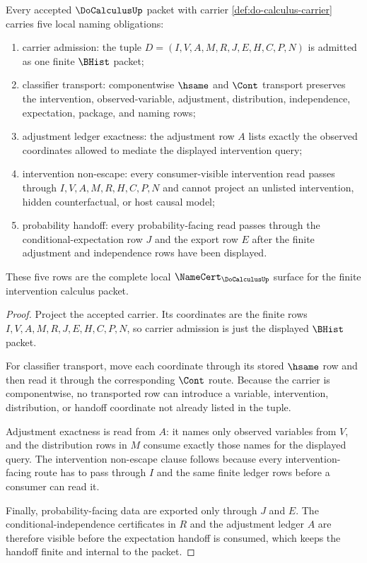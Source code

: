\begin{theorem}
\label{thm:do-calculus-namecert-obligation-surface}
Every accepted $\DoCalculusUp$ packet with carrier
\autoref{def:do-calculus-carrier} carries five local naming obligations:
\begin{enumerate}
\item carrier admission: the tuple $D=(I,V,A,M,R,J,E,H,C,P,N)$ is admitted as
one finite $\BHist$ packet;
\item classifier transport: componentwise $\hsame$ and $\Cont$ transport
preserves the intervention, observed-variable, adjustment, distribution,
independence, expectation, package, and naming rows;
\item adjustment ledger exactness: the adjustment row $A$ lists exactly the
observed coordinates allowed to mediate the displayed intervention query;
\item intervention non-escape: every consumer-visible intervention read passes
through $I,V,A,M,R,H,C,P,N$ and cannot project an unlisted intervention, hidden
counterfactual, or host causal model;
\item probability handoff: every probability-facing read passes through the
conditional-expectation row $J$ and the export row $E$ after the finite
adjustment and independence rows have been displayed.
\end{enumerate}
These five rows are the complete local $\NameCert_{\DoCalculusUp}$ surface for
the finite intervention calculus packet.
\end{theorem}
\begin{proof}
Project the accepted carrier. Its coordinates are the finite rows
$I,V,A,M,R,J,E,H,C,P,N$, so carrier admission is just the displayed $\BHist$
packet.

For classifier transport, move each coordinate through its stored $\hsame$ row
and then read it through the corresponding $\Cont$ route. Because the carrier is
componentwise, no transported row can introduce a variable, intervention,
distribution, or handoff coordinate not already listed in the tuple.

Adjustment exactness is read from $A$: it names only observed variables from
$V$, and the distribution rows in $M$ consume exactly those names for the
displayed query. The intervention non-escape clause follows because every
intervention-facing route has to pass through $I$ and the same finite ledger
rows before a consumer can read it.

Finally, probability-facing data are exported only through $J$ and $E$. The
conditional-independence certificates in $R$ and the adjustment ledger $A$ are
therefore visible before the expectation handoff is consumed, which keeps the
handoff finite and internal to the packet.
\end{proof}

